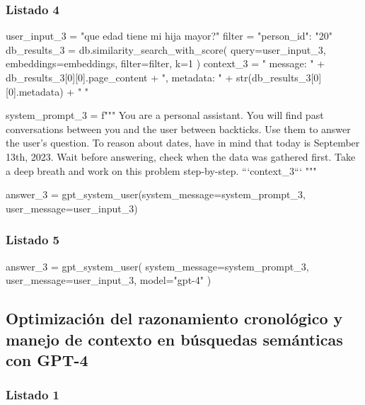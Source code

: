\subsubsection{Listado 4}
\label{anexo:code-4-1-12-4}

\begin{APACode}
user_input_3 = "que edad tiene mi hija mayor?"
filter = {"person_id": "20"}
db_results_3 = db.similarity_search_with_score(
    query=user_input_3, embeddings=embeddings, filter=filter, k=1
)
context_3 = "{ message: " + db_results_3[0][0].page_content + ", metadata: " + str(db_results_3[0][0].metadata) + " }"

system_prompt_3 = f"""
You are a personal assistant. You will find past conversations between you and the user between backticks. 
Use them to answer the user's question.
To reason about dates, have in mind that today is September 13th, 2023. 
Wait before answering, check when the data was gathered first.
Take a deep breath and work on this problem step-by-step.
```{context_3}```
"""

answer_3 = gpt_system_user(system_message=system_prompt_3, user_message=user_input_3)
\end{APACode}

\subsubsection{Listado 5}
\label{anexo:code-4-1-12-5}

\begin{APACode}
answer_3 = gpt_system_user(
    system_message=system_prompt_3, 
    user_message=user_input_3, 
    model="gpt-4"
)
\end{APACode}

\subsection{Optimización del razonamiento cronológico y manejo de contexto en búsquedas semánticas con GPT-4}

\subsubsection{Listado 1}
\label{anexo:code-4-1-13-1}

